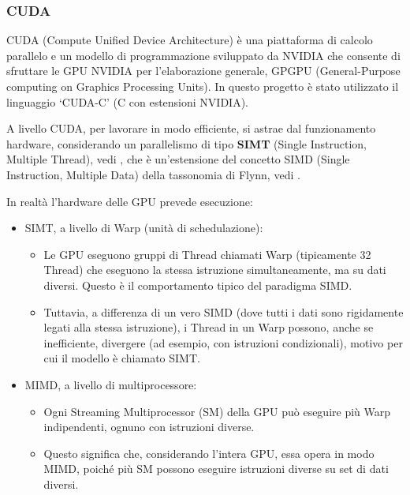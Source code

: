 \documentclass[12pt,a4paper]{report}
\begin{document}
\subsubsection{CUDA}

CUDA (Compute Unified Device Architecture) è una piattaforma di calcolo parallelo e un modello di programmazione sviluppato da
NVIDIA che consente di sfruttare le GPU NVIDIA per l'elaborazione generale, GPGPU (General-Purpose computing on Graphics
Processing Units).
In questo progetto è stato utilizzato il linguaggio `CUDA-C' (C con estensioni NVIDIA).

A livello CUDA, per lavorare in modo efficiente, si astrae dal funzionamento hardware, considerando un parallelismo di tipo
\textbf{SIMT} (Single Instruction, Multiple Thread), vedi \cite{NVIDIA2008}, che è un'estensione del concetto SIMD (Single
Instruction, Multiple Data) della tassonomia di Flynn, vedi \cite{Flynn1966}.

In realtà l'hardware delle GPU prevede esecuzione:
\begin{itemize}
  \item SIMT, a livello di Warp (unità di schedulazione):
        \begin{itemize}
          \item Le GPU eseguono gruppi di Thread chiamati Warp (tipicamente 32 Thread) che eseguono la stessa istruzione
                simultaneamente, ma su dati diversi. Questo è il comportamento tipico del paradigma SIMD.
          \item Tuttavia, a differenza di un vero SIMD (dove tutti i dati sono rigidamente legati alla stessa istruzione), i
                Thread in un Warp possono, anche se inefficiente, divergere (ad esempio, con istruzioni condizionali), motivo per
                cui il modello è chiamato SIMT.
        \end{itemize}
  \item MIMD, a livello di multiprocessore:
        \begin{itemize}
          \item Ogni Streaming Multiprocessor (SM) della GPU può eseguire più Warp indipendenti, ognuno con istruzioni diverse.
          \item Questo significa che, considerando l'intera GPU, essa opera in modo MIMD, poiché più SM possono eseguire
                istruzioni diverse su set di dati diversi.
        \end{itemize}
\end{itemize}
\end{document}
